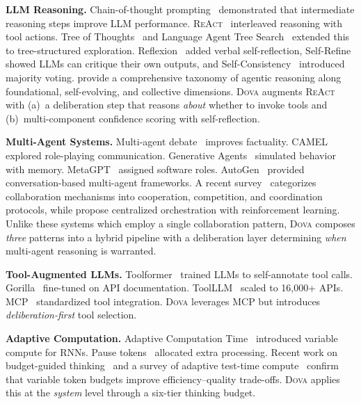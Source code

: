 \documentclass{article}
\theoremstyle{plain}
\theoremstyle{definition}
\newcommand{\dova}{\textsc{Dova}}
\newcommand{\react}{\textsc{ReAct}}
\begin{document}
\textbf{LLM Reasoning.}\quad
Chain-of-thought prompting~\citep{wei2022chain} demonstrated that intermediate
reasoning steps improve LLM performance.
\react{}~\citep{yao2023react} interleaved reasoning with tool actions.
Tree of Thoughts~\citep{yao2023tree} and Language Agent Tree
Search~\citep{zhou2023lats} extended this to tree-structured exploration.
Reflexion~\citep{shinn2023reflexion} added verbal self-reflection,
Self-Refine~\citep{madaan2023selfrefine} showed LLMs can critique their own
outputs, and Self-Consistency~\citep{wang2023selfconsistency} introduced
majority voting. \citet{wei2026agentic} provide a comprehensive taxonomy of
agentic reasoning along foundational, self-evolving, and collective
dimensions.
\dova{} augments \react{} with (a)~a deliberation step
that reasons \emph{about} whether to invoke tools and (b)~multi-component
confidence scoring with self-reflection.

\textbf{Multi-Agent Systems.}\quad
Multi-agent debate~\citep{du2023debate,liang2023debate} improves factuality.
CAMEL~\citep{li2023camel} explored role-playing communication.
Generative Agents~\citep{park2023generative} simulated behavior with memory.
MetaGPT~\citep{hong2023metagpt} assigned software roles.
AutoGen~\citep{wu2023autogen} provided conversation-based multi-agent
frameworks.  A recent survey~\citep{tran2025multiagent} categorizes
collaboration mechanisms into cooperation, competition, and coordination
protocols, while \citet{dang2025evolving} propose centralized orchestration
with reinforcement learning.
Unlike these systems which employ a single collaboration pattern,
\dova{} composes \emph{three} patterns into a hybrid pipeline with a
deliberation layer determining \emph{when} multi-agent reasoning is warranted.

\textbf{Tool-Augmented LLMs.}\quad
Toolformer~\citep{schick2023toolformer} trained LLMs to self-annotate tool
calls.  Gorilla~\citep{patil2023gorilla} fine-tuned on API documentation.
ToolLLM~\citep{qin2023toolllm} scaled to 16,000+ APIs.
MCP~\citep{anthropic2024mcp} standardized tool integration.
\dova{} leverages MCP but introduces \emph{deliberation-first} tool selection.

\textbf{Adaptive Computation.}\quad
Adaptive Computation Time~\citep{graves2016adaptive} introduced variable
compute for RNNs.  Pause tokens~\citep{goyal2023think} allocated extra
processing.  Recent work on budget-guided
thinking~\citep{li2025budget} and a survey of adaptive test-time
compute~\citep{alomrani2025reasoning} confirm that variable token budgets
improve efficiency--quality trade-offs.
\dova{} applies this at the \emph{system} level through a
six-tier thinking budget.
\end{document}
